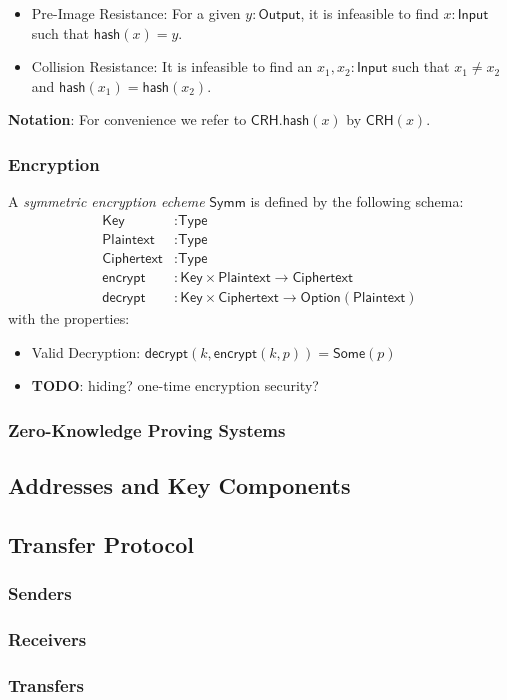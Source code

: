 \documentclass[a4paper]{article}
\newcommand{\lsubsection}[2]{\def\sectionlabel{#2} \subsection{#1}\label{sec:#2}}
\newcommand{\lsubsubsection}[2]{\def\sectionlabel{#2} \subsubsection{#1}\label{sec:#2}}
\newcommand{\TODO}[1]{{\color{red}\textbf{TODO}}: #1}
\newcommand{\CRH}{{\textsf{CRH}}}
\newcommand{\Ciphertext}{{\textsf{Ciphertext}}}
\newcommand{\Input}{{\textsf{Input}}}
\newcommand{\Key}{{\textsf{Key}}}
\newcommand{\Option}{{\textsf{Option}}}
\newcommand{\Output}{{\textsf{Output}}}
\newcommand{\Plaintext}{{\textsf{Plaintext}}}
\newcommand{\Receiver}{{\textsf{Receiver}}}
\newcommand{\Sender}{{\textsf{Sender}}}
\newcommand{\Some}{{\textsf{Some}}}
\newcommand{\Symm}{{\textsf{Symm}}}
\newcommand{\Transfer}{{\textsf{Transfer}}}
\newcommand{\Type}{{\textsf{Type}}}
\newcommand{\decrypt}{{\textsf{decrypt}}}
\newcommand{\encrypt}{{\textsf{encrypt}}}
\newcommand{\hash}{{\textsf{hash}}}
\begin{document}
\begin{itemize}
    \item Pre-Image Resistance: For a given $y : \Output$, it is infeasible to find $x : \Input$ such that $\hash(x) = y$.
    \item Collision Resistance: It is infeasible to find an $x_1, x_2 : \Input$ such that $x_1 \ne x_2$ and $\hash(x_1) = \hash(x_2)$.
\end{itemize}

\textbf{Notation}: For convenience we refer to $\CRH.\hash(x)$ by $\CRH(x)$.

\lsubsubsection{Encryption}{abstract-encryption}

A \emph{symmetric encryption echeme} $\Symm$ is defined by the following schema:
\begin{align*}
    \Key &: \Type \\
    \Plaintext &: \Type \\
    \Ciphertext &: \Type \\
    \encrypt &: \Key \times \Plaintext \to \Ciphertext \\
    \decrypt &: \Key \times \Ciphertext \to \Option(\Plaintext)
\end{align*}
with the properties:

\begin{itemize}
    \item Valid Decryption: $\decrypt(k, \encrypt(k, p)) = \Some(p)$
    \item \TODO{hiding? one-time encryption security?}
\end{itemize}

\subsubsection{Zero-Knowledge Proving Systems}

\lsubsection{Addresses and Key Components}{addresses-and-key-components}

\lsubsection{\Transfer{} Protocol}{transfer-protocol}

\subsubsection{\Sender{s}}

\subsubsection{\Receiver{s}}

\subsubsection{\Transfer{s}}
\end{document}
